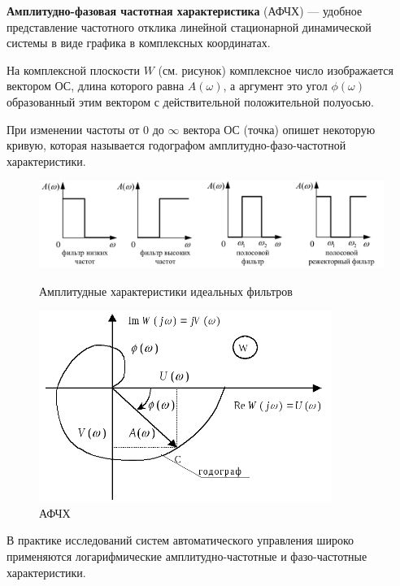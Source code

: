 \textbf{Амплитудно-фазовая частотная характеристика} (АФЧХ) — удобное представление частотного отклика линейной стационарной динамической системы в виде графика в комплексных координатах.

На комплексной плоскости $W$ (см. рисунок) комплексное число  изображается вектором ОС, длина которого равна $A(\omega)$, а аргумент это угол $\phi(\omega)$ образованный этим вектором с действительной положительной полуосью.

При изменении частоты от 0 до $\infty$ вектора ОС (точка) опишет некоторую кривую, которая называется годографом амплитудно-фазо-частотной характеристики.

\begin{figure}[h!]
    \begin{minipage}[h]{0.5\linewidth}
        \centering
        \includegraphics[width=0.8\linewidth]{images/af.png}
        \caption{Амплитудные характеристики идеальных фильтров}
        \label{fig:a_filters}    
    \end{minipage}
    \begin{minipage}[h]{0.5\linewidth}
        \centering
        \includegraphics[width=0.5\linewidth]{images/aphf.png}
        \caption{АФЧХ}
        \label{fig:aphf}
    \end{minipage}
\end{figure}
В практике исследований систем автоматического управления широко применяются логарифмические амплитудно-частотные и фазо-частотные характеристики.

